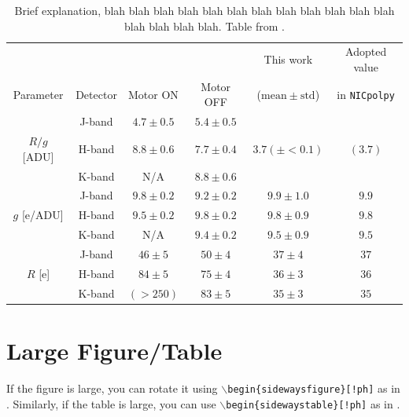 \begin{table}[!tb]
\centering
  \caption[The parameter values.]{Brief explanation, blah blah blah blah blah blah blah blah blah blah blah blah blah blah blah blah. Table from \cite{2022_SAG_NICpolpy}.}
  \label{tab: gR value}
    \begin{tabular}{cc|ccc|c}
      \hline\hline
       & & \multicolumn{2}{c}{\citet{Ishiguro2011ARNHAO}} & This work & Adopted value \\
      Parameter & Detector  & Motor ON & Motor OFF & ($\mathrm{mean} \pm \mathrm{std} $) & in \texttt{NICpolpy}\\
      \hline
                   &J-band & $ 4.7 \pm 0.5 $ & $ 5.4 \pm 0.5 $ &                     & \\
      $ R/g $ [ADU]&H-band & $ 8.8 \pm 0.6 $ & $ 7.7 \pm 0.4 $ &  $ 3.7 (\pm <0.1) $ & $ (3.7) $\\
                   &K-band & N/A             & $ 8.8 \pm 0.6 $ &                     & \\
      \hline
                   &J-band & $ 9.8 \pm 0.2 $ & $ 9.2 \pm 0.2 $ & $ 9.9 \pm 1.0 $ & $ 9.9 $\\
      $ g $ [e/ADU]&H-band & $ 9.5 \pm 0.2 $ & $ 9.8 \pm 0.2 $ & $ 9.8 \pm 0.9 $ & $ 9.8 $\\
                   &K-band & N/A             & $ 9.4 \pm 0.2 $ & $ 9.5 \pm 0.9 $ & $ 9.5 $\\
      \hline
                   &J-band & $ 46 \pm 5 $ & $ 50 \pm 4 $ & $ 37 \pm 4 $ & $ 37 $ \\
      $ R $ [e]    &H-band & $ 84 \pm 5 $ & $ 75 \pm 4 $ & $ 36 \pm 3 $ & $ 36 $ \\
                   &K-band & $ (>250) $   & $ 83 \pm 5 $ & $ 35 \pm 3 $ & $ 35 $ \\
      \hline
    \end{tabular}
\end{table}




\section{Large Figure/Table}
If the figure is large, you can rotate it using \texttt{$\backslash$begin\{sidewaysfigure\}[!ph]} as in . Similarly, if the table is large, you can use \texttt{$\backslash$begin\{sidewaystable\}[!ph]} as in .


